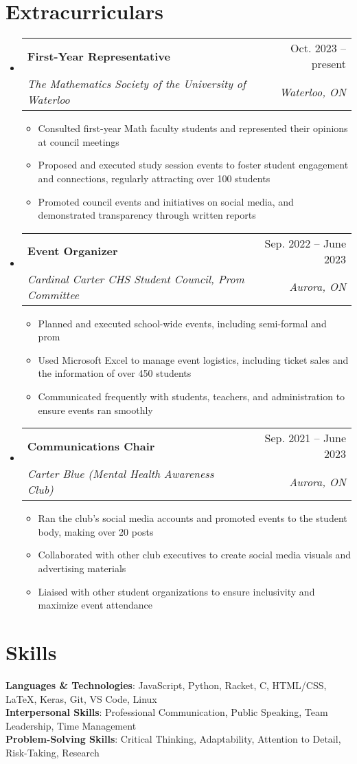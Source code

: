 \documentclass[letterpaper,11pt]{article}
\makeatletter
\newcommand{\resumeItem}[1]{
  \item\small{
    {#1 \vspace{-2pt}}
  }
}
\newcommand{\resumeSubheading}[4]{
  \vspace{-2pt}\item
    \begin{tabular*}{0.97\textwidth}[t]{l@{\extracolsep{\fill}}r}
      \textbf{#1} & #2 \\
      \textit{\small#3} & \textit{\small #4} \\
    \end{tabular*}\vspace{-7pt}
}
\newcommand{\resumeSubHeadingListStart}{\begin{itemize}[leftmargin=0.15in, label={}]}
\newcommand{\resumeSubHeadingListEnd}{\end{itemize}}
\newcommand{\resumeItemListStart}{\begin{itemize}}
\newcommand{\resumeItemListEnd}{\end{itemize}\vspace{-5pt}}
\makeatother
\begin{document}
\section{Extracurriculars}
  \resumeSubHeadingListStart

    \resumeSubheading
      {First-Year Representative}{Oct. 2023 -- present}
      {The Mathematics Society of the University of Waterloo}{Waterloo, ON}
      \resumeItemListStart
        \resumeItem{Consulted first-year Math faculty students and represented their opinions at council meetings}
        \resumeItem{Proposed and executed study session events to foster student engagement and connections, regularly attracting over 100 students}
        \resumeItem{Promoted council events and initiatives on social media, and demonstrated transparency through written reports}
      \resumeItemListEnd

    \resumeSubheading
      {Event Organizer}{Sep. 2022 -- June 2023}
      {Cardinal Carter CHS Student Council, Prom Committee}{Aurora, ON}
      \resumeItemListStart
        \resumeItem{Planned and executed school-wide events, including semi-formal and prom}
        \resumeItem{Used Microsoft Excel to manage event logistics, including ticket sales and the information of over 450 students}
        \resumeItem{Communicated frequently with students, teachers, and administration to ensure events ran smoothly}
      \resumeItemListEnd

    \resumeSubheading
      {Communications Chair}{Sep. 2021 -- June 2023}
      {Carter Blue (Mental Health Awareness Club)}{Aurora, ON}
      \resumeItemListStart
        \resumeItem{Ran the club's social media accounts and promoted events to the student body, making over 20 posts}
        \resumeItem{Collaborated with other club executives to create social media visuals and advertising materials}
        \resumeItem{Liaised with other student organizations to ensure inclusivity and maximize event attendance}
      \resumeItemListEnd

  \resumeSubHeadingListEnd

%
\section{Skills}
 \begin{itemize}[leftmargin=0.15in, label={}]
    \small{\item{
     \textbf{Languages \& Technologies}{: JavaScript, Python, Racket, C, HTML/CSS, LaTeX, Keras, Git, VS Code, Linux} \\
     \textbf{Interpersonal Skills}{: Professional Communication, Public Speaking, Team Leadership, Time Management} \\
     \textbf{Problem-Solving Skills}{: Critical Thinking, Adaptability, Attention to Detail, Risk-Taking, Research} \\
    }}
 \end{itemize}


\end{document}
